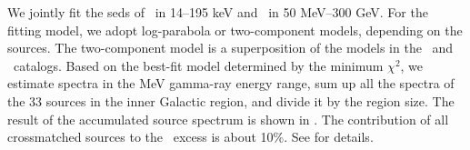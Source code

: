\documentclass[a4paper,11pt]{article}
\begin{document}
We jointly fit the \acp{sed} of \bat\ in 14--195 keV and \lat\ in 50 MeV--300 GeV.
For the fitting model, we adopt log-parabola or two-component models, depending on the sources. The two-component model is a superposition of the models in the \bat\ and \lat\ catalogs.
%
Based on the best-fit model %
determined by the minimum $\chi^2$, we estimate spectra in the MeV gamma-ray energy range, sum up all the spectra of the 33 sources in the inner Galactic region, and divide it by the region size.
The result of the accumulated source spectrum is shown in .
The contribution of all crossmatched sources to the \comptel\ excess is about 10\%. 
See \cite{tsuji_2022} for details.
\end{document}
